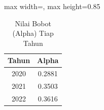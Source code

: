 \begin{table}[H]
\centering
\caption{Nilai Bobot (Alpha) Tiap Tahun} \label{tab:alpha_sample}
\begin{adjustbox}{max width=\textwidth, max height=0.85\textheight}
\begin{tabular}{|c|c|}
\hline
\textbf{Tahun} & \textbf{Alpha} \\
\hline
2020 & 0.2881 \\
2021 & 0.3503 \\
2022 & 0.3616 \\
\hline
\end{tabular}
\end{adjustbox}
\end{table}